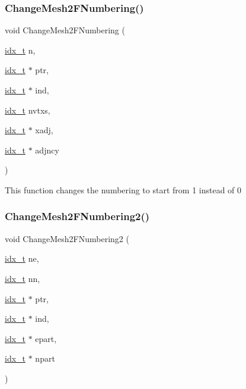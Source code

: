 \subsubsection{\texorpdfstring{Change\+Mesh2\+F\+Numbering()}{ChangeMesh2FNumbering()}}
{\footnotesize\ttfamily void Change\+Mesh2\+F\+Numbering (\begin{DoxyParamCaption}\item[{\hyperlink{a00876_aaa5262be3e700770163401acb0150f52}{idx\+\_\+t}}]{n,  }\item[{\hyperlink{a00876_aaa5262be3e700770163401acb0150f52}{idx\+\_\+t} $\ast$}]{ptr,  }\item[{\hyperlink{a00876_aaa5262be3e700770163401acb0150f52}{idx\+\_\+t} $\ast$}]{ind,  }\item[{\hyperlink{a00876_aaa5262be3e700770163401acb0150f52}{idx\+\_\+t}}]{nvtxs,  }\item[{\hyperlink{a00876_aaa5262be3e700770163401acb0150f52}{idx\+\_\+t} $\ast$}]{xadj,  }\item[{\hyperlink{a00876_aaa5262be3e700770163401acb0150f52}{idx\+\_\+t} $\ast$}]{adjncy }\end{DoxyParamCaption})}

This function changes the numbering to start from 1 instead of 0 \mbox{\label{a00945_a60a9b8fb9d30f771f5683615348a2079}} 
\subsubsection{\texorpdfstring{Change\+Mesh2\+F\+Numbering2()}{ChangeMesh2FNumbering2()}}
{\footnotesize\ttfamily void Change\+Mesh2\+F\+Numbering2 (\begin{DoxyParamCaption}\item[{\hyperlink{a00876_aaa5262be3e700770163401acb0150f52}{idx\+\_\+t}}]{ne,  }\item[{\hyperlink{a00876_aaa5262be3e700770163401acb0150f52}{idx\+\_\+t}}]{nn,  }\item[{\hyperlink{a00876_aaa5262be3e700770163401acb0150f52}{idx\+\_\+t} $\ast$}]{ptr,  }\item[{\hyperlink{a00876_aaa5262be3e700770163401acb0150f52}{idx\+\_\+t} $\ast$}]{ind,  }\item[{\hyperlink{a00876_aaa5262be3e700770163401acb0150f52}{idx\+\_\+t} $\ast$}]{epart,  }\item[{\hyperlink{a00876_aaa5262be3e700770163401acb0150f52}{idx\+\_\+t} $\ast$}]{npart }\end{DoxyParamCaption})}

